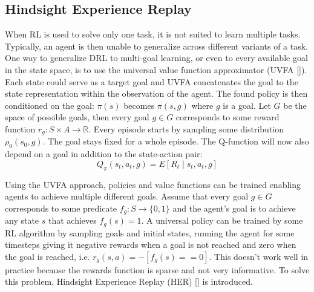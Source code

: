 \documentclass[conference]{IEEEtran}
\begin{document}
\subsection{Hindsight Experience Replay} \label{subsec:her}
When RL is used to solve only one task, it is not suited to learn multiple tasks. Typically, an agent is then unable to generalize across different variants of a task. One way to generalize DRL to multi-goal learning, or even to every available goal in the state space, is to use the universal value function approximator (UVFA [\cite{schaul2015universal}]). Each state could serve as a target goal and UVFA concatenates the goal to the state representation within the observation of the agent. The found policy is then conditioned on the goal: $\pi(s)$ becomes $\pi(s, g)$ where $g$ is a goal. Let $G$ be the space of possible goals, then every goal $g \in G$ corresponds to some reward function $r_g: S \times A \to \mathbb{R}$. Every episode starts by sampling some distribution $\rho_0(s_0, g)$. The goal stays fixed for a whole episode. The Q-function will now also depend on a goal in addition to the state-action pair:
\begin{equation*}
    Q_{\pi}(s_t, a_t, g) = E \left[R_t \mid s_t,a_t, g \right]
\end{equation*}

Using the UVFA approach, policies and value functions can be trained enabling agents to achieve multiple different goals. Assume that every goal $g \in G$ corresponds to some predicate $f_g : S \to \{0, 1\}$ and the agent's goal is to achieve any state $s$ that achieves $f_g(s) = 1$. A universal policy can be trained by some RL algorithm by sampling goals and initial states, running the agent for some timesteps giving it negative rewards when a goal is not reached and zero when the goal is reached, i.e. $r_g(s, a) = -[f_g(s) == 0]$. This doesn't work well in practice because the rewards function is sparse and not very informative. To solve this problem, Hindsight Experience Replay (HER) [\cite{andrychowicz2017hindsight}] is introduced.
\end{document}
